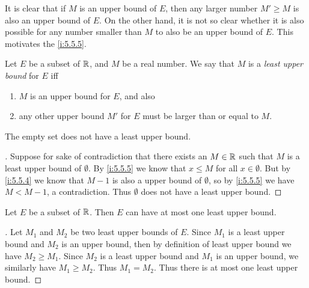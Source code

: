 \begin{note}
  It is clear that if \(M\) is an upper bound of \(E\), then any larger number \(M' \geq M\) is also an upper bound of \(E\).
  On the other hand, it is not so clear whether it is also possible for any number smaller than \(M\) to also be an upper bound of \(E\).
  This motivates the \cref{i:5.5.5}.
\end{note}

\begin{defn}\label{i:5.5.5}
  Let \(E\) be a subset of \(\mathbb{R}\), and \(M\) be a real number.
  We say that \(M\) is a \emph{least upper bound} for \(E\) iff
  \begin{enumerate}
    \item \(M\) is an upper bound for \(E\), and also
    \item any other upper bound \(M'\) for \(E\) must be larger than or equal to \(M\).
  \end{enumerate}
\end{defn}

\setcounter{thm}{6}
\begin{eg}\label{i:5.5.7}
  The empty set does not have a least upper bound.
\end{eg}

\begin{proof}[]
  Suppose for sake of contradiction that there exists an \(M \in \mathbb{R}\) such that \(M\) is a least upper bound of \(\emptyset\).
  By \cref{i:5.5.5} we know that \(x \leq M\) for all \(x \in \emptyset\).
  But by \cref{i:5.5.4} we know that \(M - 1\) is also a upper bound of \(\emptyset\), so by \cref{i:5.5.5} we have \(M < M - 1\), a contradiction.
  Thus \(\emptyset\) does not have a least upper bound.
\end{proof}

\begin{prop}\label{i:5.5.8}
  Let \(E\) be a subset of \(\mathbb{R}\).
  Then \(E\) can have at most one least upper bound.
\end{prop}

\begin{proof}[]
  Let \(M_1\) and \(M_2\) be two least upper bounds of \(E\).
  Since \(M_1\) is a least upper bound and \(M_2\) is an upper bound, then by definition of least upper bound we have \(M_2 \geq M_1\).
  Since \(M_2\) is a least upper bound and \(M_1\) is an upper bound, we similarly have \(M_1 \geq M_2\).
  Thus \(M_1 = M_2\).
  Thus there is at most one least upper bound.
\end{proof}

